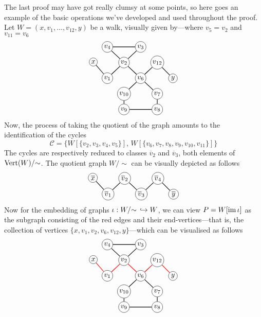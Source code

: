 The last proof may have got really clumsy at some points, so here goes an
example of the basic operations we've developed and used throughout the
proof. Let \(W = (x, v_1, \dots, v_{12}, y)\) be a walk, visually given
by---where \(v_5 = v_2\) and \(v_{11} = v_6\)
\[
\begin{tikzcd}[%
  , cells={nodes={circle, draw, inner sep=1.5pt}}
  , every arrow/.append style={dash,thick}
  , row sep=tiny
  , column sep=tiny
  ]
            &v_4 \ar[rr] \ar[dr] & &v_3 \ar[dl] & &
  \\
  x \ar[dr] & &v_2 \ar[dl] \ar[dr] & &v_{12} \ar[dr] &
  \\
            &v_1 & &v_6 \ar[ur] \ar[dl] \ar[dr] & &y
  \\
            & &v_{10} \ar[d] & &v_7 \ar[d] &
  \\
            & &v_9 \ar[rr] & &v_8 &
\end{tikzcd}
\]
Now, the process of taking the quotient of the graph amounts to the
identification of the cycles
\[
  \mathcal C = \{
    W[\{v_2, v_3, v_4, v_5\}],\,
    W[\{v_6, v_7, v_8, v_9, v_{10}, v_{11}\}]
  \}
\]
The cycles are respectively reduced to classes \(\overline v_2\) and \(\overline
v_3\), both elements of \(\operatorname{Vert}(W)/{\sim}\). The quotient graph \(W/{\sim}\) can be visually
depicted as follows
\[
\begin{tikzcd}[%
  , cells={nodes={circle, draw, inner sep=1.5pt}}
  , every arrow/.append style={dash,thick}
  , row sep=tiny
  , column sep=tiny
  ]
  \overline x \ar[dr]
  & &\overline v_2 \ar[dl] \ar[dr] & &\overline v_4 \ar[dl] \ar[dr] &
  \\
  &\overline v_1 & &\overline v_3 & &\overline y
\end{tikzcd}
\]
Now for the embedding of graphs \(\iota: W/{\sim}\, \hookrightarrow W\), we can view
\(P = W[\operatorname{im} \iota]\) as the subgraph consisting of the red edges and their
end-vertices---that is, the collection of vertices
\(\{x, v_1, v_2, v_6, v_{12}, y\}\)---which can be visualised as follows
\[
\begin{tikzcd}[%
  , cells={nodes={circle, draw, inner sep=1.5pt}}
  , every arrow/.append style={dash,thick}
  , row sep=tiny
  , column sep=tiny
  ]
            &v_4 \ar[rr] \ar[dr] & &v_3 \ar[dl] & &
  \\
  x \ar[dr, color=red] & &v_2 \ar[dl, color=red] \ar[dr, color=red]
                        & &v_{12} \ar[dr, color=red] &
  \\
            &v_1 & &v_6 \ar[ur, color=red] \ar[dl] \ar[dr] & &y
  \\
            & &v_{10} \ar[d] & &v_7 \ar[d] &
  \\
            & &v_9 \ar[rr] & &v_8 &
\end{tikzcd}
\]

